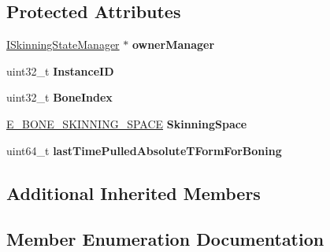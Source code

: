 \subsection*{Protected Attributes}
\begin{DoxyCompactItemize}
\item 
\hyperlink{classirr_1_1scene_1_1ISkinningStateManager}{I\+Skinning\+State\+Manager} $\ast$ {\bfseries owner\+Manager}\hypertarget{classirr_1_1scene_1_1ISkinningStateManager_1_1IBoneSceneNode_a0b58c21b7a684497a94be417f22e7cad}{}\label{classirr_1_1scene_1_1ISkinningStateManager_1_1IBoneSceneNode_a0b58c21b7a684497a94be417f22e7cad}

\item 
uint32\+\_\+t {\bfseries Instance\+ID}\hypertarget{classirr_1_1scene_1_1ISkinningStateManager_1_1IBoneSceneNode_a1a2eb0bd7dd37561e62d5c1579f605eb}{}\label{classirr_1_1scene_1_1ISkinningStateManager_1_1IBoneSceneNode_a1a2eb0bd7dd37561e62d5c1579f605eb}

\item 
uint32\+\_\+t {\bfseries Bone\+Index}\hypertarget{classirr_1_1scene_1_1ISkinningStateManager_1_1IBoneSceneNode_ab3a059c2b6add6d2d320d04adb899be8}{}\label{classirr_1_1scene_1_1ISkinningStateManager_1_1IBoneSceneNode_ab3a059c2b6add6d2d320d04adb899be8}

\item 
\hyperlink{classirr_1_1scene_1_1ISkinningStateManager_1_1IBoneSceneNode_a746e46bb30372063ca11a4695fd345bd}{E\+\_\+\+B\+O\+N\+E\+\_\+\+S\+K\+I\+N\+N\+I\+N\+G\+\_\+\+S\+P\+A\+CE} {\bfseries Skinning\+Space}\hypertarget{classirr_1_1scene_1_1ISkinningStateManager_1_1IBoneSceneNode_ab8193efc734344696dabfda9a928afd8}{}\label{classirr_1_1scene_1_1ISkinningStateManager_1_1IBoneSceneNode_ab8193efc734344696dabfda9a928afd8}

\item 
uint64\+\_\+t {\bfseries last\+Time\+Pulled\+Absolute\+T\+Form\+For\+Boning}\hypertarget{classirr_1_1scene_1_1ISkinningStateManager_1_1IBoneSceneNode_ac262bb415c1cea3d13213f5c80f02138}{}\label{classirr_1_1scene_1_1ISkinningStateManager_1_1IBoneSceneNode_ac262bb415c1cea3d13213f5c80f02138}

\end{DoxyCompactItemize}
\subsection*{Additional Inherited Members}


\subsection{Member Enumeration Documentation}
